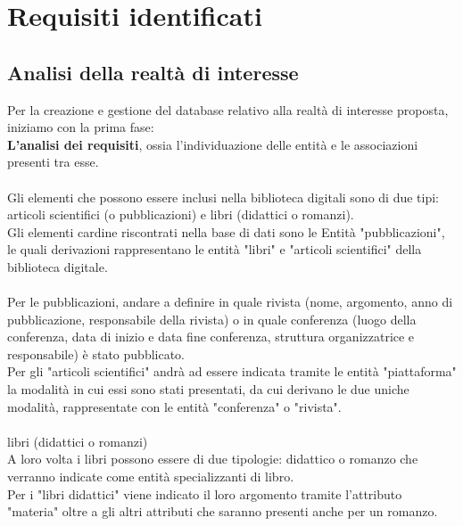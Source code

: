 \chapter{Requisiti identificati}

    \section{Analisi della realtà di interesse}
    \Large 
        Per la creazione e gestione del database relativo alla realtà di interesse proposta, iniziamo con la
        prima fase:\\
        {\bf L'analisi dei requisiti}, ossia l'individuazione delle entità e le associazioni presenti tra esse.\\ \\
    \large
        \guillemotleft 
            Gli elementi che possono essere inclusi nella biblioteca digitali sono di due tipi: articoli
            scientifici (o pubblicazioni) e libri (didattici o romanzi).
        \guillemotright
     \Large \\
    Gli elementi cardine riscontrati nella base di dati sono le Entità "pubblicazioni", le quali derivazioni rappresentano le entità "libri" e "articoli scientifici" della biblioteca digitale. \\ \\
    \large
         \guillemotleft
               Per le pubblicazioni, andare a definire in quale rivista (nome, argomento, anno di pubblicazione, responsabile della rivista) o in quale conferenza (luogo della conferenza, data di inizio e data fine conferenza, struttura organizzatrice e responsabile) è stato pubblicato.
          \guillemotright\\
    \Large
    Per gli "articoli scientifici" andrà ad essere indicata tramite le entità "piattaforma" la modalità in cui essi sono stati presentati, da cui derivano le due uniche modalità, rappresentate con le entità "conferenza" o "rivista".
    \\\\
    \large
        \guillemotleft 
            libri (didattici o romanzi)
        \guillemotright
    \Large \\ 
    A loro volta i libri possono essere di due tipologie: didattico o romanzo che verranno indicate come entità specializzanti di libro.\\
   Per i "libri didattici" viene indicato il loro argomento tramite l'attributo "materia" oltre a gli altri attributi che saranno presenti anche per un romanzo.\\ \\
